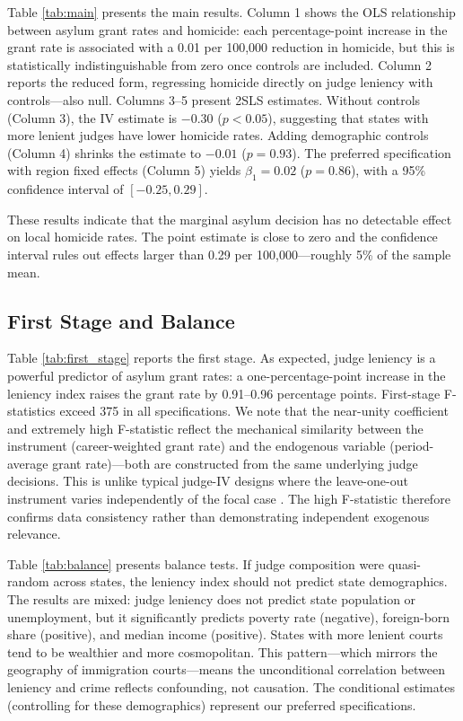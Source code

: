 \documentclass[12pt]{article}
\begin{document}
Table \ref{tab:main} presents the main results. Column 1 shows the OLS relationship between asylum grant rates and homicide: each percentage-point increase in the grant rate is associated with a 0.01 per 100,000 reduction in homicide, but this is statistically indistinguishable from zero once controls are included. Column 2 reports the reduced form, regressing homicide directly on judge leniency with controls---also null. Columns 3--5 present 2SLS estimates. Without controls (Column 3), the IV estimate is $-0.30$ ($p < 0.05$), suggesting that states with more lenient judges have lower homicide rates. Adding demographic controls (Column 4) shrinks the estimate to $-0.01$ ($p = 0.93$). The preferred specification with region fixed effects (Column 5) yields $\beta_1 = 0.02$ ($p = 0.86$), with a 95\% confidence interval of $[-0.25, 0.29]$.

These results indicate that the marginal asylum decision has no detectable effect on local homicide rates. The point estimate is close to zero and the confidence interval rules out effects larger than 0.29 per 100,000---roughly 5\% of the sample mean.

\subsection{First Stage and Balance}



Table \ref{tab:first_stage} reports the first stage. As expected, judge leniency is a powerful predictor of asylum grant rates: a one-percentage-point increase in the leniency index raises the grant rate by 0.91--0.96 percentage points. First-stage F-statistics exceed 375 in all specifications. We note that the near-unity coefficient and extremely high F-statistic reflect the mechanical similarity between the instrument (career-weighted grant rate) and the endogenous variable (period-average grant rate)---both are constructed from the same underlying judge decisions. This is unlike typical judge-IV designs where the leave-one-out instrument varies independently of the focal case \citep{dobbie2018}. The high F-statistic therefore confirms data consistency rather than demonstrating independent exogenous relevance.



Table \ref{tab:balance} presents balance tests. If judge composition were quasi-random across states, the leniency index should not predict state demographics. The results are mixed: judge leniency does not predict state population or unemployment, but it significantly predicts poverty rate (negative), foreign-born share (positive), and median income (positive). States with more lenient courts tend to be wealthier and more cosmopolitan. This pattern---which mirrors the geography of immigration courts---means the unconditional correlation between leniency and crime reflects confounding, not causation. The conditional estimates (controlling for these demographics) represent our preferred specifications.
\end{document}

